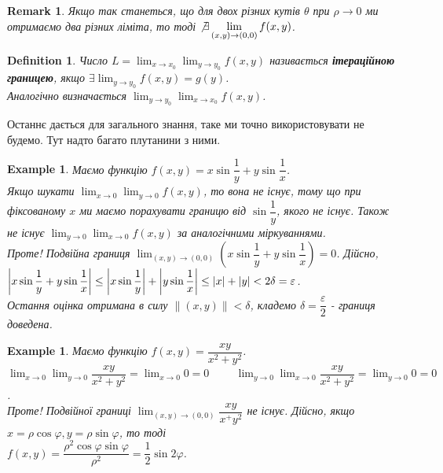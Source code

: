 \documentclass[a4paper, 10pt]{article}
\def\huge{\displaystyle}
\theoremstyle{theoremdd}
\theoremstyle{theoremdd}
\newtheorem{definition}[theorem]{Definition}
\theoremstyle{theoremdd}
\theoremstyle{theoremdd}
\newtheorem{example}[theorem]{Example}
\theoremstyle{theoremdd}
\theoremstyle{theoremdd}
\newtheorem{remark}[theorem]{Remark}
\theoremstyle{theoremdd}
\theoremstyle{theoremdd}
\newcommand\Norm[1]{\lVert#1\rVert}
\begin{document}
\begin{remark}
Якщо так станеться, що для двох різних кутів $\theta$ при $\rho \to 0$ ми отримаємо два різних ліміта, то тоді $\not\exists \huge\lim_{(x,y) \to (0,0)} f(x,y)$.
\end{remark}

\begin{definition}
Число $L = \huge\lim_{x \to x_0} \lim_{y \to y_0} f(x,y)$ називається \textbf{ітераційною границею}, якщо $\exists \huge\lim_{y \to y_0} f(x,y) = g(y)$.\\
Аналогічно визначається $\huge\lim_{y \to y_0} \lim_{x \to x_0} f(x,y)$.
\end{definition}
Останнє дається для загального знання, таке ми точно використовувати не будемо. Тут надто багато плутанини з ними.

\begin{example}
Маємо функцію $f(x,y) = x \sin \dfrac{1}{y} + y \sin \dfrac{1}{x}$.\\
Якщо шукати $\huge\lim_{x \to 0} \lim_{y \to 0} f(x,y)$, то вона не існує, тому що при фіксованому $x$ ми маємо порахувати границю від $\sin \dfrac{1}{y}$, якого не існує. Також не існує $\huge\lim_{y \to 0} \lim_{x \to 0} f(x,y)$ за аналогічними міркуваннями.\\
Проте! Подвійна границя $\huge\lim_{(x,y) \to (0,0)} \left( x \sin \dfrac{1}{y} + y \sin \dfrac{1}{x} \right) = 0$. Дійсно,\\
$\abs{x \sin \dfrac{1}{y} + y \sin \dfrac{1}{x}} \leq \abs{x \sin \dfrac{1}{y}} + \abs{y \sin \dfrac{1}{x}} \leq |x| + |y| < 2 \delta = \varepsilon$.\\
Остання оцінка отримана в силу $\Norm{(x,y)} < \delta$, кладемо $\delta = \dfrac{\varepsilon}{2}$ - границя доведена.
\end{example}

\begin{example}
Маємо функцію $f(x,y) = \dfrac{xy}{x^2+y^2}$.\\
$\huge\lim_{x \to 0} \lim_{y \to 0} \dfrac{xy}{x^2+y^2} = \lim_{x \to 0} 0 = 0 \hspace{1cm} \huge\lim_{y \to 0} \lim_{x \to 0} \dfrac{xy}{x^2+y^2} = \lim_{y \to 0} 0 = 0$.\\
Проте! Подвійної границі $\huge\lim_{(x,y) \to (0,0)} \dfrac{xy}{x^+y^2}$ не існує. Дійсно, якщо $x = \rho \cos \varphi, y = \rho \sin \varphi$, то тоді\\
$f(x,y) = \dfrac{\rho^2 \cos \varphi \sin \varphi}{\rho^2} = \dfrac{1}{2} \sin 2 \varphi$.
\end{example}
\end{document}
